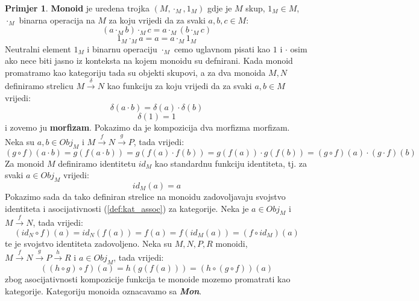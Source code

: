 \documentclass[11pt]{article}
\newcommand{\category}[1]{\textbf{\emph{#1}}}
\theoremstyle{definition}
\newtheorem{primjer}{Primjer}
\begin{document}
  \begin{primjer}
    \textbf{Monoid} je uredena trojka $(M, \cdot_M, 1_M)$ gdje je $M$ skup, $1_M
    \in M$, $\cdot_M$ binarna operacija na $M$ za koju vrijedi da za svaki $a, b, c \in M$:
    \begin{equation*}
      (a \cdot_M b) \cdot_M c = a \cdot_M (b \cdot_M c)
    \end{equation*}
    \begin{equation*}
      1_M \cdot_M a = a = a \cdot_M 1_M
    \end{equation*}
    Neutralni element $1_M$ i binarnu operaciju $\cdot_M$ cemo uglavnom pisati
    kao $1$ i $\cdot$ osim ako nece biti jasno iz konteksta na kojem monoidu
    su defnirani.
    Kada monoid promatramo kao kategoriju tada su objekti skupovi, a
    za dva monoida $M, N$ definiramo strelicu $M \xrightarrow{\delta} N$ kao
    funkciju za koju vrijedi da za svaki $a, b \in M$ vrijedi:
    \begin{equation*}
      \delta(a \cdot b) = \delta(a) \cdot \delta(b)
    \end{equation*}
    \begin{equation*}
      \delta(1) = 1
    \end{equation*}
    i zovemo ju \textbf{morfizam}.
    Pokazimo da je kompozicija dva morfizma morfizam.
    Neka su $a, b \in Obj_M$ i $M \xrightarrow{f} N \xrightarrow{g} P$, tada vrijedi:
    \begin{equation*}
      (g \circ f)(a \cdot b) = g(f(a \cdot b)) = g(f(a) \cdot f(b)) = g(f(a))
      \cdot g(f(b)) = (g \circ f)(a) \cdot (g \cdot f)(b)
    \end{equation*}
    Za monoid $M$ definiramo identitetu $id_M$ kao standardnu funkciju
    identiteta, tj. za svaki $a \in Obj_M$ vrijedi:
    \begin{equation*}
      id_M(a) = a
    \end{equation*}
    Pokazimo sada da tako definiran strelice na monoidu zadovoljavaju
    svojstvo identiteta i asocijativnosti (\ref{def:kat_assoc}) za kategorije.
    Neka je $a \in Obj_M$ i $M \xrightarrow{f} N$, tada vrijedi:
    \begin{equation*}
      (id_N \circ f)(a) = id_N(f(a)) = f(a) = f(id_M(a)) = (f \circ id_M)(a)
    \end{equation*}
    te je svojstvo identiteta zadovoljeno.
    Neka su $M, N, P, R$ monoidi, $M \xrightarrow{f} N \xrightarrow{g} P \xrightarrow{h} R$
    i $a \in Obj_M$, tada vrijedi:
    \begin{equation*}
      ((h \circ g) \circ f)(a) = h(g(f(a))) = (h \circ (g \circ f))(a)
    \end{equation*}
    zbog asocijativnosti kompozicije funkcija te monoide mozemo promatrati kao
    kategorije. Kategoriju monoida oznacavamo sa \category{Mon}.
  \end{primjer}
\end{document}
